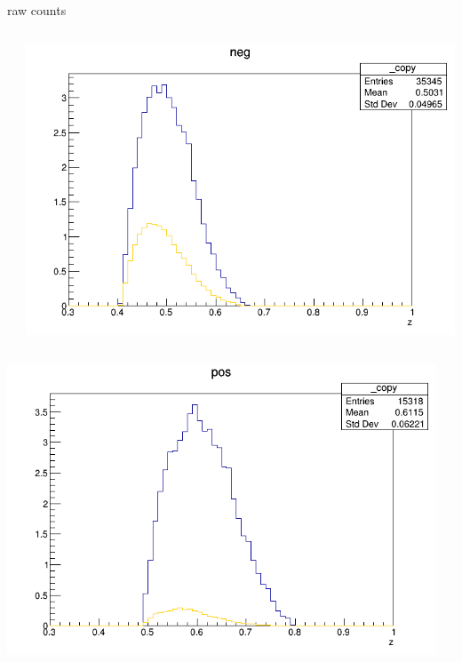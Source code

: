 \begin{frame}{raw counts}
\begin{columns}
\begin{column}[T]{0.25\textwidth}
\end{column}
\begin{column}[T]{0.25\textwidth}
\includegraphics[width = \textwidth]{results/yield/statistics/yield_x_Q2_z_0.65_5.500_0.50_neg.png}
\end{column}
\end{columns}
\begin{columns}
\begin{column}[T]{0.25\textwidth}
\includegraphics[width = \textwidth]{results/yield/statistics/yield_x_Q2_z_0.65_5.500_0.60_pos.png}
\end{column}
\begin{column}[T]{0.25\textwidth}

\end{column}
\end{columns}
\end{frame}
